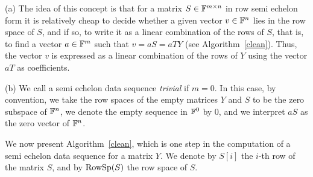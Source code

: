 \begin{Rem}\label{rem:seds}
(a) The idea of this concept is that for a matrix 
$S \in \mathbb{F}^{m\times n}$ in row semi echelon form it is relatively
cheap to decide whether a given vector $v \in \mathbb{F}^n$ lies in the row
space of $S$, and if so, to write it as a linear combination of the
rows of $S$, that is, to find a vector $a \in \mathbb{F}^m$ such that
$v = aS = aTY$ (see Algorithm~\ref{clean}). Thus, the vector
$v$ is expressed as a linear combination of the rows of $Y$
using the vector $aT$ as coefficients.

(b) We call a semi echelon data sequence \emph{trivial} if $m=0$.
In this case, by convention, we take the row spaces of
the empty matrices $Y$ and $S$ to be the zero subspace of $\mathbb{F}^n$, we
denote the empty sequence in $\mathbb{F}^0$ by $0$, and we interpret $aS$ as
the zero vector of $\mathbb{F}^n$.
\end{Rem}

\medskip
We now present Algorithm~\ref{clean}, which is one step in the
computation of a semi echelon data sequence for a matrix $Y$. We
denote by $S[i]$ the $i$-th row of the matrix $S$, and by $\mathrm{RowSp}(S)$ the 
row space of $S$.

